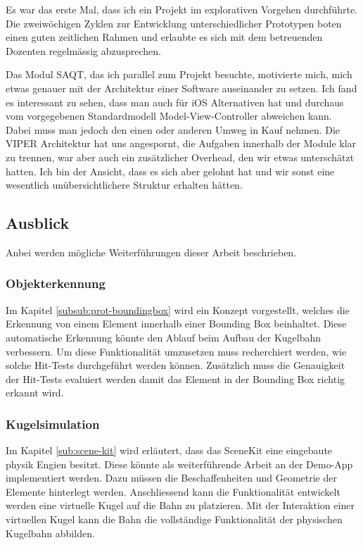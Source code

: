 Es war das erste Mal, dass ich ein Projekt im explorativen Vorgehen durchführte.
Die zweiwöchigen Zyklen zur Entwicklung unterschiedlicher Prototypen boten einen guten zeitlichen Rahmen und erlaubte es sich mit dem betreuenden Dozenten regelmässig abzusprechen.

Das Modul SAQT, das ich parallel zum Projekt besuchte, motivierte mich, mich etwas genauer mit der Architektur einer Software auseinander zu setzen.
Ich fand es interessant zu sehen, dass man auch für iOS Alternativen hat und durchaus vom vorgegebenen Standardmodell Model-View-Controller abweichen kann.
Dabei muss man jedoch den einen oder anderen Umweg in Kauf nehmen. %
Die VIPER Architektur hat uns angespornt, die Aufgaben innerhalb der Module klar zu trennen, war aber auch ein zusätzlicher Overhead, den wir etwas unterschätzt hatten.
Ich bin der Ansicht, dass es sich aber gelohnt hat und wir sonst eine wesentlich unübersichtlichere Struktur erhalten hätten.

\subsection{Ausblick}

Anbei werden mögliche Weiterführungen dieser Arbeit beschrieben.

\subsubsection{Objekterkennung}
Im Kapitel \ref{subsub:prot-boundingbox} wird ein Konzept vorgestellt, welches die Erkennung von einem Element innerhalb einer Bounding Box beinhaltet. Diese automatische Erkennung könnte den Ablauf beim Aufbau der Kugelbahn verbessern. Um diese Funktionalität umzusetzen muss recherchiert werden, wie solche Hit-Tests durchgeführt werden können. Zusätzlich muss die Genauigkeit der Hit-Tests evaluiert werden damit das Element in der Bounding Box richtig erkannt wird.

\subsubsection{Kugelsimulation}
Im Kapitel \ref{sub:scene-kit} wird erläutert, dass das SceneKit eine eingebaute physik Engien besitzt. Diese könnte als weiterführende Arbeit an der Demo-App implementiert werden. Dazu müssen die Beschaffenheiten und Geometrie der Elemente hinterlegt werden. Anschliessend kann die Funktionalität entwickelt werden eine virtuelle Kugel auf die Bahn zu platzieren. Mit der Interaktion einer virtuellen Kugel kann die Bahn die vollständige Funktionalität der physischen Kugelbahn abbilden.

